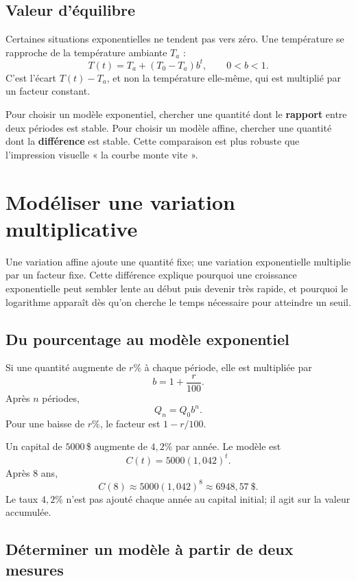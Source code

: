 \documentclass[12pt,a4paper,openany]{book}
\begin{document}
\subsection{Valeur d'équilibre}
Certaines situations exponentielles ne tendent pas vers zéro. Une température se rapproche de la température ambiante $T_a$ :
\[
T(t)=T_a+(T_0-T_a)b^t,
\qquad 0<b<1.
\]
C'est l'écart $T(t)-T_a$, et non la température elle-même, qui est multiplié par un facteur constant.

\begin{connectionbox}
Pour choisir un modèle exponentiel, chercher une quantité dont le \textbf{rapport} entre deux périodes est stable. Pour choisir un modèle affine, chercher une quantité dont la \textbf{différence} est stable. Cette comparaison est plus robuste que l'impression visuelle « la courbe monte vite ».
\end{connectionbox}


\section{Modéliser une variation multiplicative}

Une variation affine ajoute une quantité fixe; une variation exponentielle multiplie par un facteur fixe. Cette différence explique pourquoi une croissance exponentielle peut sembler lente au début puis devenir très rapide, et pourquoi le logarithme apparaît dès qu'on cherche le temps nécessaire pour atteindre un seuil.

\subsection{Du pourcentage au modèle exponentiel}

Si une quantité augmente de $r\%$ à chaque période, elle est multipliée par
\[
b=1+\frac r{100}.
\]
Après $n$ périodes,
\[
Q_n=Q_0b^n.
\]
Pour une baisse de $r\%$, le facteur est $1-r/100$.

\begin{examplebox}
Un capital de $5000\,$\$ augmente de $4{,}2\%$ par année. Le modèle est
\[
C(t)=5000(1{,}042)^t.
\]
Après $8$ ans,
\[
C(8)\approx5000(1{,}042)^8\approx6948{,}57\ \$.
\]
Le taux $4{,}2\%$ n'est pas ajouté chaque année au capital initial; il agit sur la valeur accumulée.
\end{examplebox}

\subsection{Déterminer un modèle à partir de deux mesures}
\end{document}
